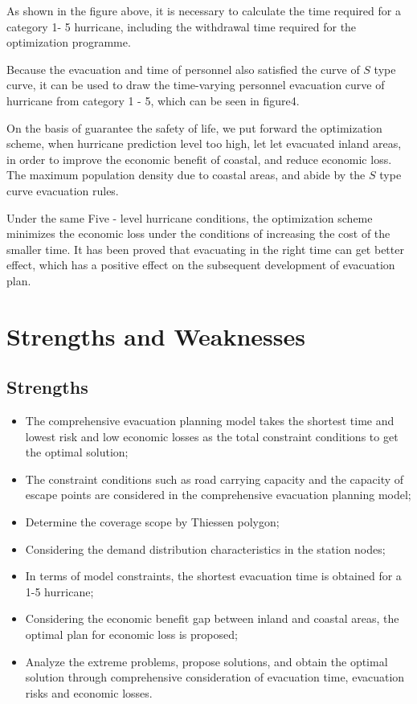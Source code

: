 \documentclass{mcmthesis}
\begin{document}
As shown in the figure above, it is necessary to calculate the time required for a category 1- 5 hurricane, including the withdrawal time required for the optimization programme.

Because the evacuation and time of personnel also satisfied the curve of $S$ type curve, it can be used to draw the time-varying personnel evacuation curve of hurricane from category 1 - 5, which can be seen in figure4.



On the basis of guarantee the safety of life, we put forward the optimization scheme, when hurricane prediction level too high, let let evacuated inland areas, in order to improve the economic benefit of coastal, and reduce economic loss. The maximum population density due to coastal areas, and abide by the $S$ type curve evacuation rules.


Under the same Five - level hurricane conditions, the optimization scheme minimizes the economic loss under the conditions of increasing the cost of the smaller time. It has been proved that evacuating in the right time can get better effect, which has a positive effect on the subsequent development of evacuation plan.

\section{Strengths and Weaknesses}

\subsection{Strengths}

\begin{itemize}
  \item The comprehensive evacuation planning model takes the shortest time and lowest risk and low economic losses as the total constraint conditions to get the optimal solution;
  \item The constraint conditions such as road carrying capacity and the capacity of escape points are considered in the comprehensive evacuation planning model;
  \item Determine the coverage scope by Thiessen polygon;
  \item Considering the demand distribution characteristics in the station nodes;
  \item In terms of model constraints, the shortest evacuation time is obtained for a 1-5 hurricane;
  \item Considering the economic benefit gap between inland and coastal areas, the optimal plan for economic loss is proposed;
  \item Analyze the extreme problems, propose solutions, and obtain the optimal solution through comprehensive consideration of evacuation time, evacuation risks and economic losses.
\end{itemize}
\end{document}
